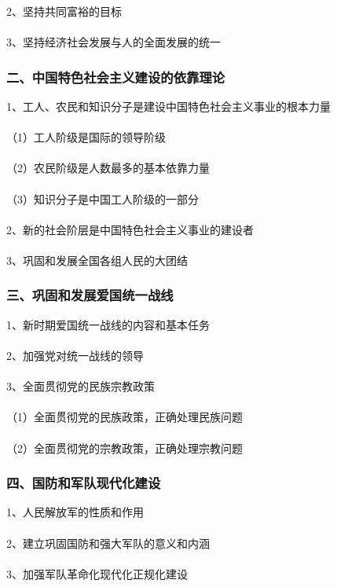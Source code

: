 \documentclass{ctexart}
\begin{document}
2、坚持共同富裕的目标
\\\\

3、坚持经济社会发展与人的全面发展的统一

\subsubsection{二、中国特色社会主义建设的依靠理论}
1、工人、农民和知识分子是建设中国特色社会主义事业的根本力量
\\\\
（1）工人阶级是国际的领导阶级
\\\\
（2）农民阶级是人数最多的基本依靠力量
\\\\
（3）知识分子是中国工人阶级的一部分
\\\\

2、新的社会阶层是中国特色社会主义事业的建设者
\\\\

3、巩固和发展全国各组人民的大团结

\subsubsection{三、巩固和发展爱国统一战线}
1、新时期爱国统一战线的内容和基本任务
\\\\

2、加强党对统一战线的领导
\\\\

3、全面贯彻党的民族宗教政策
\\\\
（1）全面贯彻党的民族政策，正确处理民族问题
\\\\
（2）全面贯彻党的宗教政策，正确处理宗教问题

\subsubsection{四、国防和军队现代化建设}
1、人民解放军的性质和作用
\\\\

2、建立巩固国防和强大军队的意义和内涵
\\\\

3、加强军队革命化现代化正规化建设
\end{document}

